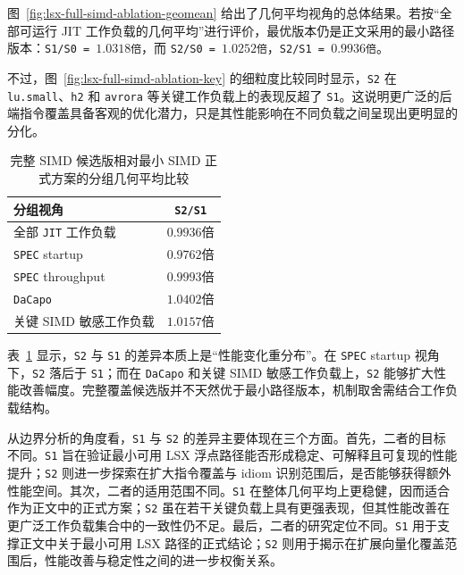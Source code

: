 图~\ref{fig:lsx-full-simd-ablation-geomean} 给出了几何平均视角的总体结果。若按“全部可运行 JIT 工作负载的几何平均”进行评价，最优版本仍是正文采用的最小路径版本：\texttt{S1/S0 = $1.0318$倍}，而 \texttt{S2/S0 = $1.0252$倍}，\texttt{S2/S1 = $0.9936$倍}。

不过，图~\ref{fig:lsx-full-simd-ablation-key} 的细粒度比较同时显示，\texttt{S2} 在 \texttt{lu.small}、\texttt{h2} 和 \texttt{avrora} 等关键工作负载上的表现反超了 \texttt{S1}。这说明更广泛的后端指令覆盖具备客观的优化潜力，只是其性能影响在不同负载之间呈现出更明显的分化。

\begin{table}[htbp]
    \centering
    \small
    \caption{完整 SIMD 候选版相对最小 SIMD 正式方案的分组几何平均比较}
    \label{tab:s2-boundary-groups}
    \begin{tabular}{lc}
        \toprule
        \textbf{分组视角} & \textbf{\texttt{S2/S1}} \\
        \midrule
        全部 \texttt{JIT} 工作负载 & $0.9936$倍 \\
        \texttt{SPEC} startup & $0.9762$倍 \\
        \texttt{SPEC} throughput & $0.9993$倍 \\
        \texttt{DaCapo} & $1.0402$倍 \\
        关键 SIMD 敏感工作负载 & $1.0157$倍 \\
        \bottomrule
    \end{tabular}
\end{table}

表~\ref{tab:s2-boundary-groups} 显示，\texttt{S2} 与 \texttt{S1} 的差异本质上是“性能变化重分布”。在 \texttt{SPEC} startup 视角下，\texttt{S2} 落后于 \texttt{S1}；而在 \texttt{DaCapo} 和关键 SIMD 敏感工作负载上，\texttt{S2} 能够扩大性能改善幅度。完整覆盖候选版并不天然优于最小路径版本，机制取舍需结合工作负载结构。

从边界分析的角度看，\texttt{S1} 与 \texttt{S2} 的差异主要体现在三个方面。首先，二者的目标不同。\texttt{S1} 旨在验证最小可用 LSX 浮点路径能否形成稳定、可解释且可复现的性能提升；\texttt{S2} 则进一步探索在扩大指令覆盖与 idiom 识别范围后，是否能够获得额外性能空间。其次，二者的适用范围不同。\texttt{S1} 在整体几何平均上更稳健，因而适合作为正文中的正式方案；\texttt{S2} 虽在若干关键负载上具有更强表现，但其性能改善在更广泛工作负载集合中的一致性仍不足。最后，二者的研究定位不同。\texttt{S1} 用于支撑正文中关于最小可用 LSX 路径的正式结论；\texttt{S2} 则用于揭示在扩展向量化覆盖范围后，性能改善与稳定性之间的进一步权衡关系。

